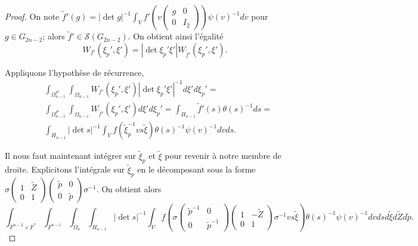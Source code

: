 \documentclass{amsart}
\begin{document}
\begin{proof}
On note $\widetilde{f}'(g) = |\det g|^{-1}\int_V f'\left(v\begin{pmatrix}
g & 0 \\
0 & I_2
\end{pmatrix}\right) \psi(v)^{-1} dv$ pour $g \in G_{2n-2}$; alors $\widetilde{f}' \in \mathcal{S}(G_{2n-2})$. On obtient ainsi l'égalité
\begin{equation}
W_{f'}(\xi_p', \xi') = |\det \xi_p' \xi'| W_{\widetilde{f}'}(\xi_p', \xi').
\end{equation}

Appliquons l'hypothèse de récurrence,
 \begin{equation}
 \begin{split}
 & \int_{\Omega^P_{n-1}} \int_{\Omega_{n-1}} W_{f'}(\xi_p', \xi') |\det \xi_p'\xi'|^{-1} d\xi' d\xi_p' = \\
 & \int_{\Omega^P_{n-1}} \int_{\Omega_{n-1}} W_{\widetilde{f}'}(\xi_p', \xi') d\xi' d\xi_p' = \int_{H_{n-1}} \widetilde{f}'(s) \theta(s)^{-1} ds = \\
 & \int_{H_{n-1}} |\det s|^{-1} \int_V f(\widetilde{\xi}_p^{-1}v s \widetilde{\xi}) \theta(s)^{-1} \psi(v)^{-1} dv ds.
 \end{split}
 \end{equation}

Il nous faut maintenant intégrer sur $\widetilde{\xi}_p$ et $\widetilde{\xi}$ pour revenir à notre membre de droite. Explicitons l'intégrale sur $\widetilde{\xi}_p$ en le décomposant sous la forme $\sigma \begin{pmatrix}
1 & \widetilde{Z} \\
0 & 1
\end{pmatrix}\begin{pmatrix}
\widetilde{p} & 0 \\
0 & \widetilde{p}
\end{pmatrix} \sigma^{-1}$. On obtient alors
\begin{equation}
\int_{F^{n-2} \times F^*} \int_{F^{n-1}} \int_{\widetilde{\Omega}_n} \int_{H_{n-1}} |\det s|^{-1} \int_V f\left(\sigma \begin{pmatrix}
\widetilde{p}^{-1} & 0 \\
0 & \widetilde{p}^{-1}
\end{pmatrix} \begin{pmatrix}
1 & -\widetilde{Z} \\
0 & 1
\end{pmatrix} \sigma^{-1} v s \widetilde{\xi}\right) \theta(s)^{-1} \psi(v)^{-1} dv ds d\widetilde{\xi} d\widetilde{Z} d\widetilde{p}.
\end{equation}


\end{proof}
\end{document}
